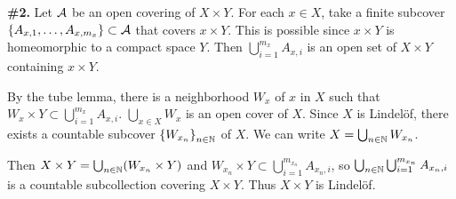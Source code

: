 \documentclass[a4paper,11pt]{article}
\begin{document}
\newpage

\phantom{?}
\vspace{5mm}

\begin{minipage}[t][270mm]{90mm}
    {\bfseries \large \#2.} Let \(\mathcal{A}\) be an open covering of \(X \times Y\). For each \(x \in X\), take a finite subcover \(\{A_{x, 1}, \dots, A_{x, m_x}\} \\\subset \mathcal{A}\) that covers \(x \times Y\). This is possible since \(x \times Y\) is homeomorphic to a compact space \(Y\). Then \(\bigcup_{i=1}^{m_x} A_{x, i}\) is an open set of \(X \times Y\) containing \(x \times Y\).

    By the tube lemma, there is a neighborhood \(W_x\) of \(x\) in \(X\) such that \(W_x \times Y \subset \bigcup_{i=1}^{m_x} A_{x, i}\). \(\bigcup_{x \in X} W_x\) is an open cover of \(X\). Since \(X\) is Lindelöf, there exists a countable subcover \(\left\{ W_{x_n} \right\}_{n \in \mathbb{N}}\) of \(X\). We can write \(X = \bigcup_{n \in \mathbb{N}} W_{x_n}\).

    Then \(X \times Y = \bigcup_{n\in \mathbb{N}} (W_{x_n} \times Y)\) and \(W_{x_n} \times Y \subset \bigcup_{i=1}^{m_{x_n}} A_{x_n, i}\), so \(\bigcup_{n\in \mathbb{N}} \bigcup_{i=1}^{m_{x_n}} A_{x_n, i}\) is a countable subcollection covering \(X \times Y\). Thus \(X \times Y\) is Lindelöf.
\end{minipage}
{\color{gray}\vline}
\begin{minipage}[t][270mm]{90mm}
    \phantom{?}
\end{minipage}

\newpage

\phantom{?}
\vspace{5mm}
\end{document}
